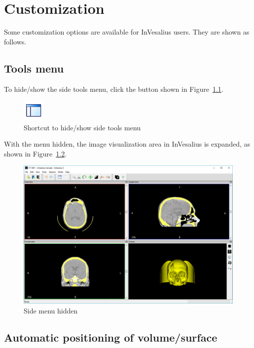\chapter{Customization}

Some customization options are available for InVesalius users. They are shown as follows.

\section{Tools menu}

To hide/show the side tools menu, click the button shown in Figure~\ref{fig:layout_full_original}.

\begin{figure}[!htb]
\centering
\includegraphics[scale=0.5]{../user_guide_figures/icons/layout_full_original.png}
\caption{Shortcut to hide/show side tools menu}
\label{fig:layout_full_original}
\end{figure}

With the menu hidden, the image visualization area in InVesalius is expanded, as shown in Figure~\ref{fig:closed_tool_menu}.

\begin{figure}[!htb]
\centering
\includegraphics[scale=0.4]{../user_guide_figures/invesalius_screen/window_mpr_not_painels_en.png}
\caption{Side menu hidden}
\label{fig:closed_tool_menu}
\end{figure}

\newpage

\section{Automatic positioning of volume/surface}

